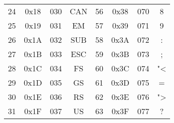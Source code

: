 \documentclass[a4paper]{scrartcl}
\begin{document}
\begin{longtable}{|c|c|c|c||c|c|c|c|}
        24 & 0x18 & 030 & CAN & 56 & 0x38 & 070 & 8 \\
        25 & 0x19 & 031 & EM & 57 & 0x39 & 071 & 9 \\
        26 & 0x1A & 032 & SUB & 58 & 0x3A & 072 & : \\
        27 & 0x1B & 033 & ESC & 59 & 0x3B & 073 & ; \\
        28 & 0x1C & 034 & FS & 60 & 0x3C & 074 & "< \\
        29 & 0x1D & 035 & GS & 61 & 0x3D & 075 & =\\
        30 & 0x1E & 036 & RS & 62 & 0x3E & 076 & "> \\
        31 & 0x1F & 037 & US & 63 & 0x3F & 077 & ? \\
        \hline
        \end{longtable}
\end{document}
